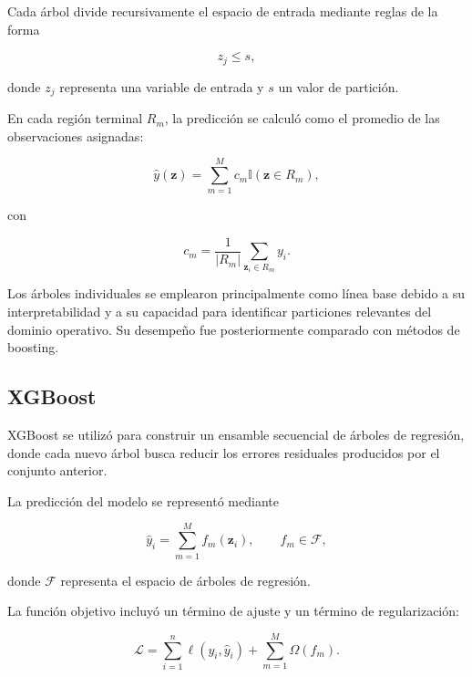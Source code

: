 Cada árbol divide recursivamente el espacio de entrada mediante reglas de la forma

\begin{equation}
z_j \leq s,
\end{equation}

donde $z_j$ representa una variable de entrada y $s$ un valor de partición.

En cada región terminal $R_m$, la predicción se calculó como el promedio de las observaciones asignadas:

\begin{equation}
\hat{y}(\mathbf{z})
=
\sum_{m=1}^{M}
c_m
\mathbb{I}
\left(
\mathbf{z}\in R_m
\right),
\label{eq:arbol_regresion_metodo}
\end{equation}

con

\begin{equation}
c_m
=
\frac{1}{|R_m|}
\sum_{\mathbf{z}_i\in R_m}
y_i.
\end{equation}

Los árboles individuales se emplearon principalmente como línea base debido a su interpretabilidad y a su capacidad para identificar particiones relevantes del dominio operativo. Su desempeño fue posteriormente comparado con métodos de boosting.

\subsection{XGBoost}
\label{subsec:xgboost_metodologia}

XGBoost se utilizó para construir un ensamble secuencial de árboles de regresión, donde cada nuevo árbol busca reducir los errores residuales producidos por el conjunto anterior.

La predicción del modelo se representó mediante

\begin{equation}
\hat{y}_i
=
\sum_{m=1}^{M}
f_m(\mathbf{z}_i),
\qquad
f_m\in\mathcal{F},
\label{eq:xgboost_prediccion}
\end{equation}

donde $\mathcal{F}$ representa el espacio de árboles de regresión.

La función objetivo incluyó un término de ajuste y un término de regularización:

\begin{equation}
\mathcal{L}
=
\sum_{i=1}^{n}
\ell
\left(
y_i,\hat{y}_i
\right)
+
\sum_{m=1}^{M}
\Omega(f_m).
\label{eq:xgboost_objetivo}
\end{equation}

